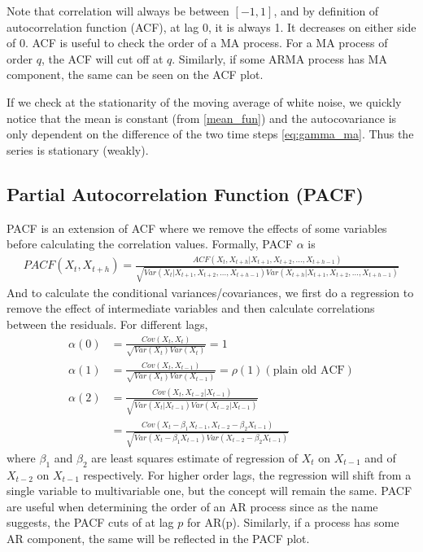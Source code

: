 \documentclass[../../time_series_notes.tex]{subfiles}
\begin{document}
Note that correlation will always be between $[-1,1]$, and by definition of autocorrelation function (ACF), at lag 0, it is always 1. It decreases on either side of 0. ACF is useful to check the order of a MA process. For a MA process of order $q$, the ACF will cut off at $q$. Similarly, if some ARMA process has MA component, the same can be seen on the ACF plot.\newline

If we check at the stationarity of the moving average of white noise, we quickly notice that the mean is constant (from \ref{mean_fun}) and the autocovariance is only dependent on the difference of the two time steps \eqref{eq:gamma_ma}. Thus the series is stationary (weakly).

\subsection{Partial Autocorrelation Function (PACF)}
PACF is an extension of ACF where we remove the effects of some variables before calculating the correlation values. Formally, PACF $\alpha$ is
\begin{align*}
    PACF(X_{t},X_{t+h}) = \frac{ACF(X_{t},X_{t+h}|X_{t+1},X_{t+2},\ldots,X_{t+h-1})}{\sqrt{Var(X_{t}|X_{t+1},X_{t+2},\ldots,X_{t+h-1})Var(X_{t+h}|X_{t+1},X_{t+2},\ldots,X_{t+h-1})}}
\end{align*}
And to calculate the conditional variances/covariances, we first do a regression to remove the effect of intermediate variables and then calculate correlations between the residuals. For different lags,
\begin{align*}
    \alpha(0) &= \frac{Cov(X_{t}, X_{t})}{\sqrt{Var(X_{t})Var(X_{t})}} = 1\\
    \alpha(1) &= \frac{Cov(X_{t}, X_{t-1})}{\sqrt{Var(X_{t})Var(X_{t-1})}} = \rho(1) (\text{plain old ACF})\\
    \alpha(2) &= \frac{Cov(X_{t}, X_{t-2} \rvert X_{t-1})}{\sqrt{Var(X_{t} \lvert X_{t-1})Var(X_{t-2} \lvert X_{t-1})}}\\
    &= \frac{Cov(X_{t} - \beta_{1}X_{t-1}, X_{t-2} - \beta_{2}X_{t-1})}{\sqrt{Var(X_{t} - \beta_{1}X_{t-1})Var(X_{t-2} - \beta_{2}X_{t-1})}}
\end{align*}
where $\beta_{1}$ and $\beta_{2}$ are least squares estimate of regression of $X_{t}$ on $X_{t-1}$ and of $X_{t-2}$ on $X_{t-1}$ respectively. For higher order lags, the regression will shift from a single variable to multivariable one, but the concept will remain the same. PACF are useful when determining the order of an AR process since as the name suggests, the PACF cuts of at lag $p$ for AR(p). Similarly, if a process has some AR component, the same will be reflected in the PACF plot.
\end{document}
